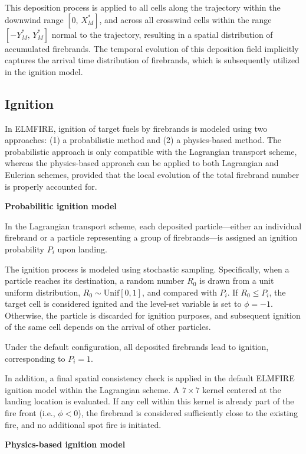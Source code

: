 This deposition process is applied to all cells along the trajectory within the downwind range $[0,\, X_M^*]$, and across all crosswind cells within the range $[-Y_M^*,\, Y_M^*]$ normal to the trajectory, resulting in a spatial distribution of accumulated firebrands. The temporal evolution of this deposition field implicitly captures the arrival time distribution of firebrands, which is subsequently utilized in the ignition model.

\subsection{Ignition}

In ELMFIRE, ignition of target fuels by firebrands is modeled using two approaches: (1) a probabilistic method and (2) a physics-based method. The probabilistic approach is only compatible with the Lagrangian transport scheme, whereas the physics-based approach can be applied to both Lagrangian and Eulerian schemes, provided that the local evolution of the total firebrand number is properly accounted for.

\textbf{Probabilitic ignition model}

In the Lagrangian transport scheme, each deposited particle—either an individual firebrand or a particle representing a group of firebrands—is assigned an ignition probability $P_i$ upon landing.

The ignition process is modeled using stochastic sampling. Specifically, when a particle reaches its destination, a random number $R_0$ is drawn from a unit uniform distribution, $R_0 \sim \text{Unif}[0,1]$, and compared with $P_i$. If $R_0 \le P_i$, the target cell is considered ignited and the level-set variable is set to $\phi = -1$. Otherwise, the particle is discarded for ignition purposes, and subsequent ignition of the same cell depends on the arrival of other particles.

Under the default configuration, all deposited firebrands lead to ignition, corresponding to $P_i = 1$.

In addition, a final spatial consistency check is applied in the default ELMFIRE ignition model within the Lagrangian scheme. A $7 \times 7$ kernel centered at the landing location is evaluated. If any cell within this kernel is already part of the fire front (i.e., $\phi < 0$), the firebrand is considered sufficiently close to the existing fire, and no additional spot fire is initiated.

\textbf{Physics-based ignition model}

